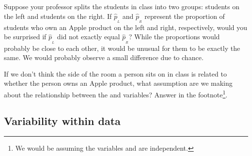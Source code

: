 
\begin{example}{Suppose your professor splits the students in class into two groups: students on the left and students on the right. If $\hat{p}_{_L}$ and $\hat{p}_{_R}$ represent the proportion of students who own an Apple product on the left and right, respectively, would you be surprised if $\hat{p}_{_L}$ did not {exactly} equal $\hat{p}_{_R}$?}\label{classRightLeftSideForHeight}
While the proportions would probably be close to each other, it would be unusual for them to be exactly the same. We would probably observe a small difference due to {chance}.
\end{example}

\begin{exercise}
If we don't think the side of the room a person sits on in class is related to whether the person owns an Apple product, what assumption are we making about the relationship between the  and  variables? %
Answer in the footnote\footnote{We would be assuming the variables  and  are independent. %
}.
\end{exercise}

\subsection{Variability within data}
\label{variabilityWithinData}

